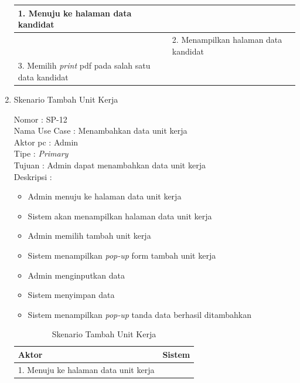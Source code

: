 \begin{enumerate}
\begin{table}
\begin{tabular}{ | p{61.5mm} | p{67mm} |}
		1.	Menuju ke halaman data kandidat &  \\
		
		\hline
		
		&  2.	Menampilkan halaman data kandidat \\
		
		\hline
		
		3. Memilih \textit{print} pdf pada salah satu data kandidat & \\
		
		\hline
	
		
	\end{tabular}
\end{table}

\item Skenario Tambah Unit Kerja

Nomor \kern 3.6pc : SP-12 \\
Nama Use Case : Menambahkan data unit kerja \\
Aktor  pc : Admin \\
Tipe \kern 4.6pc : \textit{Primary} \\
Tujuan \kern 3.6pc : Admin dapat menambahkan data unit kerja \\
Deskripsi \kern 2.5pc : 

\begin{itemize}
	\item Admin menuju ke halaman data unit kerja
	\item Sistem akan menampilkan halaman data unit kerja
	\item Admin memilih tambah unit kerja
	\item Sistem menampilkan \textit{pop-up} form tambah unit kerja
	\item Admin menginputkan data
	\item Sistem menyimpan data
	\item Sistem menampilkan\textit{ pop-up} tanda data berhasil ditambahkan
	
\end{itemize}

\begin{table}
	\caption{Skenario Tambah Unit Kerja}
	\centering
	\begin{tabular}{ | l | p{65mm} |}
		\hline 
		\textbf{Aktor} & \textbf{Sistem} \\
		\hline
		
		1.	Menuju ke halaman data unit kerja &  \\
		
		\hline
		

\end{tabular}
\end{table}
\end{enumerate}

